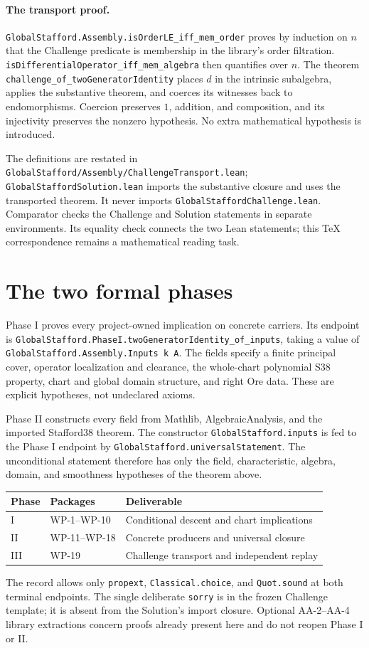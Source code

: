 \documentclass[11pt,a4paper]{article}
\newcommand{\code}[1]{\nolinkurl{#1}}
\begin{document}
\paragraph{The transport proof.}
\code{GlobalStafford.Assembly.isOrderLE_iff_mem_order} proves by induction on $n$
that the Challenge predicate is membership in the library's order filtration.
\code{isDifferentialOperator_iff_mem_algebra} then quantifies over $n$.
The theorem \code{challenge_of_twoGeneratorIdentity} places $d$ in the intrinsic
subalgebra, applies the substantive theorem, and coerces its witnesses back to
endomorphisms. Coercion preserves $1$, addition, and composition, and its
injectivity preserves the nonzero hypothesis. No extra mathematical hypothesis
is introduced.

The definitions are restated in
\code{GlobalStafford/Assembly/ChallengeTransport.lean}; \code{GlobalStaffordSolution.lean}
imports the substantive closure and uses the transported theorem. It never
imports \code{GlobalStaffordChallenge.lean}. Comparator checks the Challenge and Solution
statements in separate environments. Its equality check connects the two Lean
statements; this TeX correspondence remains a mathematical reading task.

\section{The two formal phases}\label{sec:phases}
Phase I proves every project-owned implication on concrete carriers. Its endpoint
is \code{GlobalStafford.PhaseI.twoGeneratorIdentity_of_inputs}, taking a value
of \code{GlobalStafford.Assembly.Inputs k A}. The fields specify a finite
principal cover, operator localization and clearance, the whole-chart polynomial
S38 property, chart and global domain structure, and right Ore data.
These are explicit hypotheses, not undeclared axioms.

Phase II constructs every field from Mathlib, AlgebraicAnalysis, and the imported
Stafford38 theorem. The constructor \code{GlobalStafford.inputs} is fed to the
Phase I endpoint by \code{GlobalStafford.universalStatement}. The unconditional
statement therefore has only the field, characteristic, algebra, domain, and
smoothness hypotheses of the theorem above.

\begin{center}
\begin{tabular}{@{}lll@{}}
\toprule
Phase & Packages & Deliverable \\
\midrule
I & WP-1--WP-10 & Conditional descent and chart implications \\
II & WP-11--WP-18 & Concrete producers and universal closure \\
III & WP-19 & Challenge transport and independent replay \\
\bottomrule
\end{tabular}
\end{center}
The record allows only \code{propext}, \code{Classical.choice}, and
\code{Quot.sound} at both terminal endpoints. The single deliberate
\code{sorry} is in the frozen Challenge template; it is absent from the
Solution's import closure. Optional AA-2--AA-4 library extractions concern proofs
already present here and do not reopen Phase I or II.
\end{document}

